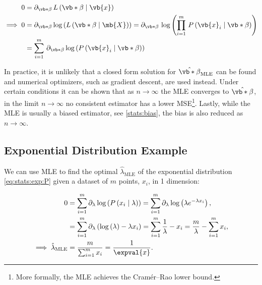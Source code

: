 \begin{subequations}\label{eq:MLE}
\begin{align}
0 &= \partial_{\vb*{\beta}} \, L\left(\vb*{\beta} \mid \vb{x}\right) \label{eq:MLE:L} \\
\implies 0 &= \partial_{\vb*{\beta}} \log\left(L\left(\vb*{\beta} \mid \mb{X}\right)\right) = \partial_{\vb*{\beta}} \, \log\left(\prod_{i=1}^{m} \, P\left(\vb{x}_{i} \mid \vb*{\beta}\right)\right) \label{eq:MLE:log_L} \\
&= \sum_{i=1}^{m} \, \partial_{\vb*{\beta}} \log\left(P\left(\vb{x}_{i} \mid \vb*{\beta}\right)\right) \label{eq:MLE:log_L_sum}
\end{align}
\end{subequations}

In practice, it is unlikely that a closed form solution for $\hat{\vb*{\beta}}_{\text{MLE}}$ can be found
and numerical optimizers, such as gradient descent, are used instead.
Under certain conditions it can be shown that as $n \to \infty$ the MLE converges to $\hat{\vb*{\beta}}$,
\ie in the limit $n \to \infty$ no consistent estimator
has a lower MSE\footnote{More formally, the MLE achieves the Cram\'er--Rao lower bound.}.
Lastly, while the MLE is usually a biased estimator, see \cref{stats:bias},
the bias is also reduced as $n \to \infty$.

\subsection{Exponential Distribution Example}
\label{opt:MLE:exp_ex}

We can use MLE to find the optimal $\hat{\lambda}_{\text{MLE}}$ of
the exponential distribution \cref{eq:stats:exp:P}
given a dataset of $m$ points, $x_{i}$, in 1 dimension:

\begin{subequations}\label{eq:MLE:exp_ex}
\begin{align}
0 &= \sum_{i=1}^{m} \partial_{\lambda} \log\left(P\left(x_{i} \mid \lambda\right)\right) = \sum_{i=1}^{m} \partial_{\lambda} \log\left(\lambda e^{-\lambda x_{i}}\right), \label{eq:MLE:exp_ex:log_L_sum} \\
&= \sum_{i=1}^{m}\partial_{\lambda} \left( \log\left(\lambda\right) -\lambda x_{i}\right) = \sum_{i=1}^{m} \frac{1}{\lambda} - x_{i} = \frac{m}{\lambda} - \sum_{i=1}^{m} x_{i}, \label{eq:MLE:exp_ex:solve} \\
\implies \hat{\lambda}_{\text{MLE}} &= \frac{m}{\sum_{i=1}^{m} x_{i}} = \frac{1}{\expval{x}}. \label{eq:MLE:exp_ex:lambda}
\end{align}
\end{subequations}

